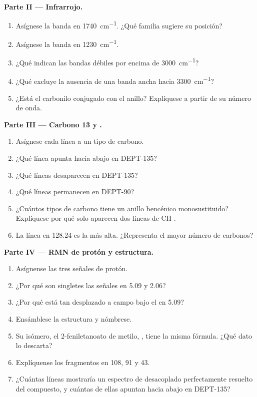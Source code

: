 \begin{problem}
\medskip
\noindent\textbf{Parte II --- Infrarrojo.}
\begin{enumerate}[resume]
  \item Asígnese la banda en \qty{1740}{cm^{-1}}. ¿Qué familia sugiere su posición?
  \item Asígnese la banda en \qty{1230}{cm^{-1}}.
  \item ¿Qué indican las bandas débiles por encima de \qty{3000}{cm^{-1}}?
  \item ¿Qué excluye la ausencia de una banda ancha hacia \qty{3300}{cm^{-1}}?
  \item ¿Está el carbonilo conjugado con el anillo? Explíquese a partir de su número de onda.
\end{enumerate}

\medskip
\noindent\textbf{Parte III --- Carbono 13 y .}
\begin{enumerate}[resume]
  \item Asígnese cada línea a un tipo de carbono.
  \item ¿Qué línea apunta hacia abajo en DEPT-135?
  \item ¿Qué líneas desaparecen en DEPT-135?
  \item ¿Qué líneas permanecen en DEPT-90?
  \item ¿Cuántos tipos de carbono tiene un anillo bencénico monosustituido? Explíquese por qué solo aparecen dos líneas
        de CH .
  \item La línea en 128.24 es la más alta. ¿Representa el mayor número de carbonos?
\end{enumerate}

\medskip
\noindent\textbf{Parte IV --- RMN de protón y estructura.}
\begin{enumerate}[resume]
  \item Asígnense las tres señales de protón.
  \item ¿Por qué son singletes las señales en 5.09 y 2.06?
  \item ¿Por qué está tan desplazado a campo bajo el  en 5.09?
  \item Ensámblese la estructura y nómbrese.
  \item Su isómero, el 2-feniletanoato de metilo, , tiene la misma fórmula. ¿Qué dato lo
        descarta?
  \item Explíquense los fragmentos en 108, 91 y 43.
  \item ¿Cuántas líneas mostraría un espectro de  desacoplado perfectamente resuelto del compuesto, y
        cuántas de ellas apuntan hacia abajo en DEPT-135?
\end{enumerate}
\end{problem}
